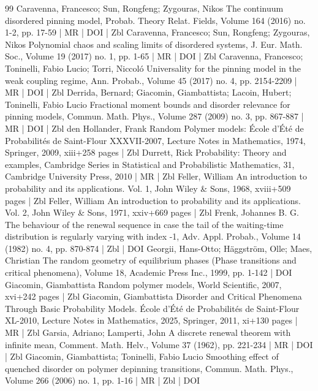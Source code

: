 \begin{thebibliography}{99}
Caravenna, Francesco; Sun, Rongfeng; Zygouras, Nikos The continuum disordered pinning model, Probab. Theory Relat. Fields, Volume 164 (2016) no. 1-2, pp. 17-59 | MR | DOI | Zbl
Caravenna, Francesco; Sun, Rongfeng; Zygouras, Nikos Polynomial chaos and scaling limits of disordered systems, J. Eur. Math. Soc., Volume 19 (2017) no. 1, pp. 1-65 | MR | DOI | Zbl
Caravenna, Francesco; Toninelli, Fabio Lucio; Torri, Niccoló Universality for the pinning model in the weak coupling regime, Ann. Probab., Volume 45 (2017) no. 4, pp. 2154-2209 | MR | DOI | Zbl
Derrida, Bernard; Giacomin, Giambattista; Lacoin, Hubert; Toninelli, Fabio Lucio Fractional moment bounds and disorder relevance for pinning models, Commun. Math. Phys., Volume 287 (2009) no. 3, pp. 867-887 | MR | DOI | Zbl
den Hollander, Frank Random Polymer models: École d’Été de Probabilités de Saint-Flour XXXVII-2007, Lecture Notes in Mathematics, 1974, Springer, 2009, xiii+258 pages | Zbl
Durrett, Rick Probability: Theory and examples, Cambridge Series in Statistical and Probabilistic Mathematics, 31, Cambridge University Press, 2010 | MR | Zbl
Feller, William An introduction to probability and its applications. Vol. 1, John Wiley \& Sons, 1968, xviii+509 pages | Zbl
Feller, William An introduction to probability and its applications. Vol. 2, John Wiley \& Sons, 1971, xxiv+669 pages | Zbl
Frenk, Johannes B. G. The behaviour of the renewal sequence in case the tail of the waiting-time distribution is regularly varying with index -1, Adv. Appl. Probab., Volume 14 (1982) no. 4, pp. 870-874 | Zbl | DOI
Georgii, Hans-Otto; Häggström, Olle; Maes, Christian The random geometry of equilibrium phases (Phase transitions and critical phenomena), Volume 18, Academic Press Inc., 1999, pp. 1-142 | DOI
Giacomin, Giambattista Random polymer models, World Scientific, 2007, xvi+242 pages | Zbl
Giacomin, Giambattista Disorder and Critical Phenomena Through Basic Probability Models. École d’Été de Probabilités de Saint-Flour XL-2010, Lecture Notes in Mathematics, 2025, Springer, 2011, xi+130 pages | MR | Zbl
Garsia, Adriano; Lamperti, John A discrete renewal theorem with infinite mean, Comment. Math. Helv., Volume 37 (1962), pp. 221-234 | MR | DOI | Zbl
Giacomin, Giambattista; Toninelli, Fabio Lucio Smoothing effect of quenched disorder on polymer depinning transitions, Commun. Math. Phys., Volume 266 (2006) no. 1, pp. 1-16 | MR | Zbl | DOI

\end{thebibliography}
